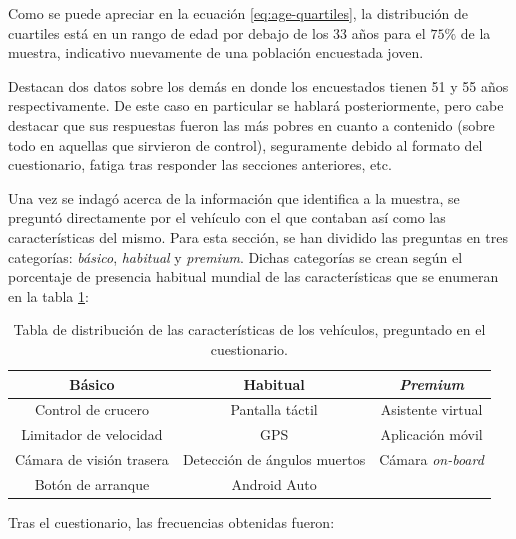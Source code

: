 Como se puede apreciar en la ecuación \ref{eq:age-quartiles}, la distribución de
cuartiles está en un rango de edad por debajo de los 33 años para el $75\%$ de la
muestra, indicativo nuevamente de una población encuestada joven.

Destacan dos datos sobre los demás en donde los encuestados tienen 51 y 55 años
respectivamente. De este caso en particular se hablará posteriormente, pero cabe
destacar que sus respuestas fueron las más pobres en cuanto a contenido (sobre todo
en aquellas que sirvieron de control), seguramente debido al formato del
cuestionario, fatiga tras responder las secciones anteriores, etc.

Una vez se indagó acerca de la información que identifica a la muestra, se preguntó
directamente por el vehículo con el que contaban así como las características del
mismo. Para esta sección, se han dividido las preguntas en tres categorías:
\textit{básico}, \textit{habitual} y \textit{premium}. Dichas categorías se crean
según el porcentaje de presencia habitual mundial de las características que se
enumeran en la tabla \ref{tab:car-specs}:

\begin{table}[H]
  \centering
  \begin{tabular}{|c|c|c|}
    \hline
    \textbf{Básico}          & \textbf{Habitual}            & \textit{\textbf{Premium}} \\
    \hline\hline
    Control de crucero       & Pantalla táctil              & Asistente virtual         \\
    Limitador de velocidad   & GPS                          & Aplicación móvil          \\
    Cámara de visión trasera & Detección de ángulos muertos & Cámara \textit{on-board}  \\
    Botón de arranque        & Android Auto                 &                           \\
    \hline
  \end{tabular}
  \caption{Tabla de distribución de las características de los vehículos, preguntado en el cuestionario.}
  \label{tab:car-specs}
\end{table}

Tras el cuestionario, las frecuencias obtenidas fueron:

